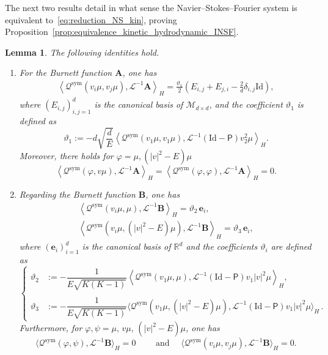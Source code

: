 \documentclass[10pt]{amsart}
\newtheorem{lemm}[theo]{Lemma}\newtheorem{prop}[theo]{Proposition}\newtheorem{coro}[theo]{Corollary}\newtheorem{conj}[theo]{Conjecture}
\theoremstyle{definition}\newtheorem{defi}[theo]{Definition}\newtheorem{rema}[theo]{Remark}\newtheorem{exam}[theo]{Example}\newtheorem{exem}[theo]{Example}\newtheorem{nota}[theo]{Notation}
\newcommand{\sym}{\mathrm{sym}}
\newcommand{\Id}{\mathrm{Id}}
\newcommand{\BurA}{{\mathbf{A}}}
\newcommand{\BurB}{{\mathbf{B}}}
\newcommand{\Bure}{\mathbf{e}}
\newcommand{\R}{\mathbb{R}}
\newcommand{\LL}{\mathcal{L}}
\newcommand{\PP}{\mathsf{P}}
\newcommand{\QQ}{\mathcal{Q}}
\newcommand{\MMM}{\mathscr{M}}
\newcommand{\Ss}{H}
\newcommand{\la}{\langle}
\newcommand{\ra}{\rangle}
\begin{document}
The next two results detail in what sense the Navier--Stokes--Fourier system is equivalent to~\eqref{eq:reduction_NS_kin}, proving Proposition~\ref{prop:equivalence_kinetic_hydrodynamic_INSF}.
\begin{lemm}
The following identities hold.\label{lem:Q_A}
\begin{enumerate}
\item For the Burnett function $\BurA $, one has
\begin{gather*}
\left\la \QQ^\sym\left(v_i \mu, v_j \mu\right), \LL^{-1}\BurA \right\ra_{\Ss} = \frac{\vartheta_1}{2} \left(E_{i, j} + E_{j, i} - \frac{2}{d} \delta_{i, j} \Id \right),
\end{gather*}
where $(E_{i, j})_{i, j = 1}^d$ is the canonical basis of $\MMM_{d\times d}$, and the coefficient $\vartheta_1$ is defined as
\begin{equation*}
\vartheta_1 := - d \sqrt{ \dfrac{d}{E} } \left\la \QQ^\sym(v_1 \mu, v_1 \mu), \LL^{-1} \left(\Id - \PP \right) v_2^2 \mu \right\ra_{\Ss}.
\end{equation*}
Moreover, there holds for $\varphi = \mu, (|v|^2-E) \mu$
\begin{equation*}
\left\la \QQ^\sym(\varphi, v \mu), \LL^{-1}\BurA \right\ra_{\Ss} = \left\la \QQ^\sym(\varphi, \varphi), \LL^{-1}\BurA \right\ra_{\Ss} = 0.
\end{equation*}
\item Regarding the Burnett function $\BurB $, one has
\begin{gather*}
\left\la \QQ^\sym(v_i \mu, \mu), \LL^{-1}\BurB \right\ra_{\Ss} = \vartheta_2 \, \Bure_i, \\
\left\la \QQ^\sym(v_i \mu, \left(|v|^2 - E \right) \mu), \LL^{-1}\BurB \right\ra_{\Ss} = \vartheta_3 \, \Bure_i,
\end{gather*}
where $(\bm{e}_i)_{i=1}^d$ is the canonical basis of $\R^d$ and the coefficients $\vartheta_i$ are defined as
\begin{equation*}
\begin{cases}
\vartheta_2 &:= - \dfrac{1}{E \sqrt{K (K-1)}} \left\la \QQ^\sym(v_1 \mu, \mu), \LL^{-1} \left(\Id - \PP \right) v_1 |v|^2 \mu \right\ra_{\Ss},\\
\\
\vartheta_3 &:= - \dfrac{1}{E \sqrt{K (K-1)}} \big\la \QQ^\sym(v_1 \mu, \left(|v|^2 - E \right) \mu), \LL^{-1} \left(\Id - \PP \right) v_1 |v|^2 \mu \big\ra_{\Ss}\,.
\end{cases}
\end{equation*}
Furthermore, for $\varphi, \psi = \mu, \, v \mu, \, \left(|v|^2 - E \right) \mu$, one has
\begin{equation*}
\big\la \QQ^\sym(\varphi, \psi), \LL^{-1}\BurB \big\ra_{\Ss} = 0 \qquad \text{ and } \quad
\big\la \QQ^\sym(v_i \mu, v_j \mu), \LL^{-1}\BurB \big\ra_{\Ss} = 0.
\end{equation*}
\end{enumerate}
\end{lemm}
\end{document}
